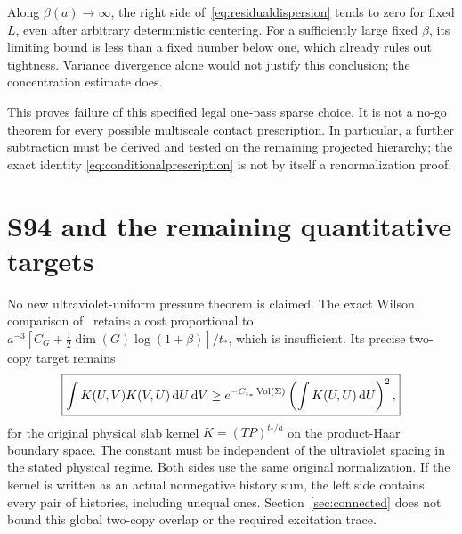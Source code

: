 \documentclass[11pt,letterpaper]{article}
\theoremstyle{plain}
\theoremstyle{remark}\newtheorem{remark}[theorem]{Scope}
\newcommand{\dd}{\,\mathrm d}\newcommand{\OH}{\mathcal O_H}
\begin{document}
Along $\beta(a)\to\infty$, the right side of~\eqref{eq:residualdispersion}
tends to zero for fixed $L$, even after arbitrary deterministic centering.
For a sufficiently large fixed $\beta$, its limiting bound is less than a
fixed number below one, which already rules out tightness. Variance divergence
alone would not justify this conclusion; the concentration estimate does.

This proves failure of this specified legal one-pass sparse choice. It is
not a no-go theorem for every possible multiscale contact prescription.
In particular, a further subtraction must be derived and tested on the
remaining projected hierarchy; the exact identity
\eqref{eq:conditionalprescription} is not by itself a renormalization proof.

\section{S94 and the remaining quantitative targets}
\label{sec:status}

No new ultraviolet-uniform pressure theorem is claimed. The exact
Wilson comparison of~\cite[\S8]{PW} retains a cost proportional to
$a^{-3}[C_G+\frac12\dim(G)\log(1+\beta)]/t_*$, which is insufficient.
Its precise two-copy target remains
\begin{equation}
\boxed{
\int K(U,V)K(V,U)\dd U\dd V
\ge e^{-C_{t_*}\Vol(\Sigma)}
\left(\int K(U,U)\dd U\right)^2,}
\label{eq:S94}
\end{equation}
for the original physical slab kernel
$K=(TP)^{t_*/a}$ on the product-Haar boundary space. The constant must be
independent of the ultraviolet spacing in the stated physical regime.
Both sides use the same original normalization. If the kernel is written
as an actual nonnegative history sum, the left side contains every pair of
histories, including unequal ones. Section~\ref{sec:connected} does not
bound this global two-copy overlap or the required excitation trace.
\end{document}

